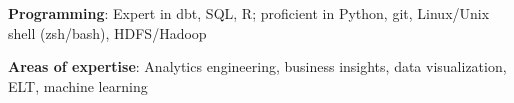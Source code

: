 

\begin{cvparagraph}

\textbf{Programming}: Expert in dbt, SQL, R; proficient in Python, git, Linux/Unix shell (zsh/bash), HDFS/Hadoop

\textbf{Areas of expertise}: Analytics engineering, business insights, data visualization, ELT, machine learning

\end{cvparagraph}
